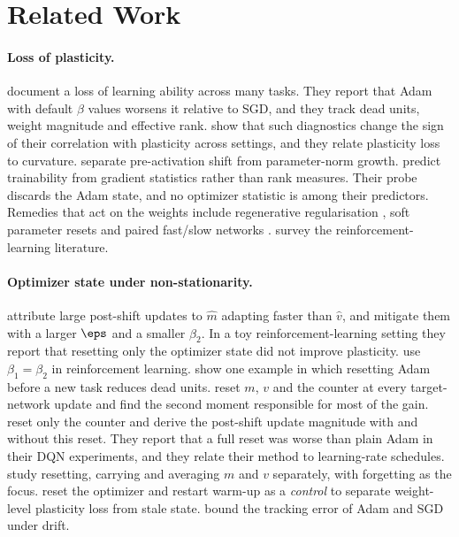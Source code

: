 \section{Related Work}
\label{sec:related}

\paragraph{Loss of plasticity.}
\citet{dohare2024loss} document a loss of learning ability across many tasks. They report that Adam with
default $\beta$ values worsens it relative to SGD, and they track dead units, weight magnitude and
effective rank. \citet{lyle2023understanding} show that such diagnostics change the sign of their
correlation with plasticity across settings, and they relate plasticity loss to curvature.
\citet{lyle2024disentangling} separate pre-activation shift from parameter-norm growth.
\citet{wang2026predicting} predict trainability from gradient statistics rather than rank measures.
Their probe discards the Adam state, and no optimizer statistic is among their predictors. Remedies that
act on the weights include regenerative regularisation \citep{kumar2024maintaining}, soft parameter
resets \citep{galashov2024nonstationary} and paired fast/slow networks \citep{lee2024slow}.
\citet{klein2024plasticity} survey the reinforcement-learning literature.

\paragraph{Optimizer state under non-stationarity.}
\citet{lyle2023understanding} attribute large post-shift updates to $\hat m$ adapting faster than
$\hat v$, and mitigate them with a larger $\eps$ and a smaller $\beta_2$. In a toy reinforcement-learning
setting they report that resetting only the optimizer state did not improve plasticity.
\citet{dohare2024loss} use $\beta_1=\beta_2$ in reinforcement learning. \citet{lyle2024disentangling}
show one example in which resetting Adam before a new task reduces dead units.
\citet{asadi2023resetting} reset $m$, $v$ and the counter at every target-network update and find the
second moment responsible for most of the gain. \citet{ellis2024adam} reset only the counter and derive
the post-shift update magnitude with and without this reset. They report that a full reset was worse
than plain Adam in their DQN experiments, and they relate their method to learning-rate schedules.
\citet{kang2024continual} study resetting, carrying and averaging $m$ and $v$ separately, with forgetting
as the focus. \citet{hernandezgarcia2026scale} reset the optimizer and restart warm-up as a
\emph{control} to separate weight-level plasticity loss from stale state. \citet{sahu2026adapt} bound
the tracking error of Adam and SGD under drift.

